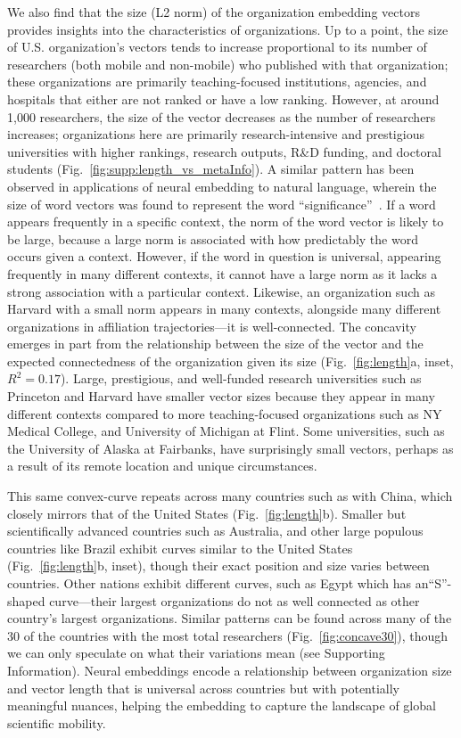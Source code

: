 \documentclass[12pt]{article} %
\def\SI{Supporting Information}
\begin{document}
We also find that the size (L2 norm) of the organization embedding vectors provides insights into the characteristics of organizations.
Up to a point, the size of U.S. organization's vectors tends to increase proportional to its number of researchers (both mobile and non-mobile) who published with that organization;
these organizations are primarily teaching-focused institutions, agencies, and hospitals that either are not ranked or have a low ranking.
However, at around 1,000 researchers, the size of the vector decreases as the number of researchers increases;
organizations here are primarily research-intensive and prestigious universities with higher rankings, research outputs, R\&D funding, and doctoral students (Fig.~\ref{fig:supp:length_vs_metaInfo}).
A similar pattern has been observed in applications of neural embedding to natural language, wherein the size of word vectors was found to represent the word ``significance''~\autocite{schakel2015measuring}.
If a word appears frequently in a specific context, the norm of the word vector is likely to be large, because a large norm is associated with how predictably the word occurs given a context.
However, if the word in question is universal, appearing frequently in many different contexts, it cannot have a large norm as it lacks a strong association with a particular context.
Likewise, an organization such as Harvard with a small norm appears in many contexts, alongside many different organizations in affiliation trajectories---it is well-connected.
The concavity emerges in part from the relationship between the size of the vector and the expected connectedness of the organization given its size (Fig.~\ref{fig:length}a, inset, $R^{2} = 0.17$).
Large, prestigious, and well-funded research universities such as Princeton and Harvard have smaller vector sizes because they appear in many different contexts compared to more teaching-focused organizations such as NY Medical College, and University of Michigan at Flint.
Some universities, such as the University of Alaska at Fairbanks, have surprisingly small vectors, perhaps as a result of its remote location and unique circumstances.


This same convex-curve repeats across many countries such as with China, which closely mirrors that of the United States (Fig.~\ref{fig:length}b).
Smaller but scientifically advanced countries such as Australia, and other large populous countries like Brazil exhibit curves similar to the United States (Fig.~\ref{fig:length}b, inset), though their exact position and size varies between countries.
Other nations exhibit different curves, such as Egypt which has an``S''-shaped curve---their largest organizations do not as well connected as other country's largest organizations. 
Similar patterns can be found across many of the 30 of the countries with the most total researchers (Fig.~\ref{fig:concave30}), though we can only speculate on what their variations mean (see \SI).
Neural embeddings encode a relationship between organization size and vector length that is universal across countries but with potentially meaningful nuances, helping the embedding to capture the landscape of global scientific mobility. 
\end{document}
